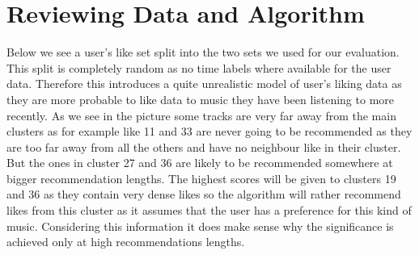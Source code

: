\documentclass[cic,tc,english]{iiufrgs}
\begin{document}
\section{Reviewing Data and Algorithm}
Below we see a user's like set split into the two sets we used for our evaluation. This split is completely random as no time labels where available for the user data. Therefore this introduces a quite unrealistic model of user's liking data as they are more probable to like data to music they have been listening to more recently. As we see in the picture some tracks are very far away from the main clusters as for example like 11 and 33 are never going to be recommended as they are too far away from all the others and have no neighbour like in their cluster. But the ones in cluster 27 and 36 are likely to be recommended somewhere at bigger recommendation lengths. The highest scores will be given to clusters 19 and 36 as they contain very dense likes so the algorithm will rather recommend likes from this cluster as it assumes that the user has a preference for this kind of music. Considering this information it does make sense why the significance is achieved only at high recommendations lengths.
\end{document}
